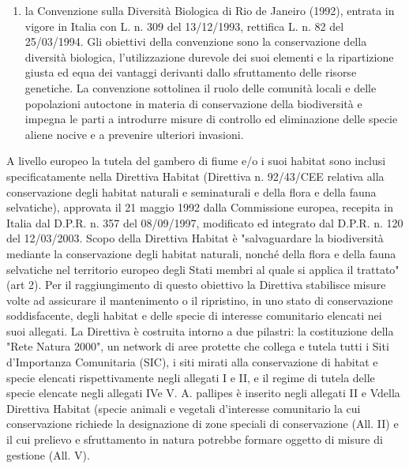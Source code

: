 \documentclass[11pt,a4paper,italian,twoside,openany]{memoir}
\begin{document}
\begin{enumerate}[label=\roman*]
  \item la Convenzione sulla Diversità Biologica di Rio de Janeiro (1992), entrata in vigore in Italia con L. n. 309 del 13/12/1993, rettifica L. n. 82 del 25/03/1994. Gli obiettivi della convenzione sono la conservazione della diversità biologica, l'utilizzazione durevole dei suoi elementi e la ripartizione giusta ed equa dei vantaggi derivanti dallo sfruttamento delle risorse genetiche. La convenzione sottolinea il ruolo delle comunità locali e delle popolazioni autoctone in materia di conservazione della biodiversità e impegna le parti a introdurre misure di controllo ed eliminazione delle specie aliene nocive e a prevenire ulteriori invasioni.
\end{enumerate}

A livello europeo la tutela del gambero di fiume e/o i suoi habitat sono inclusi specificatamente nella Direttiva Habitat (Direttiva n. 92/43/CEE relativa alla conservazione degli habitat naturali e seminaturali e della flora e della fauna selvatiche), approvata il 21 maggio 1992 dalla Commissione europea, recepita in Italia dal D.P.R. n. 357 del 08/09/1997, modificato ed integrato dal D.P.R. n. 120 del 12/03/2003. Scopo della Direttiva Habitat è "salvaguardare la biodiversità mediante la conservazione degli habitat naturali, nonché della flora e della fauna selvatiche nel territorio europeo degli Stati membri al quale si applica il trattato" (art 2). Per il raggiungimento di questo obiettivo la Direttiva stabilisce misure volte ad assicurare il mantenimento o il ripristino, in uno stato di conservazione soddisfacente, degli habitat e delle specie di interesse comunitario elencati nei suoi allegati. La Direttiva è costruita intorno a due pilastri: la costituzione della "Rete Natura 2000", un network di aree protette che collega e tutela tutti i Siti d'Importanza Comunitaria (SIC), i siti mirati alla conservazione di habitat e specie elencati rispettivamente negli allegati I e II, e il regime di tutela delle specie elencate negli allegati IVe V. A. pallipes  è inserito negli allegati II e Vdella Direttiva Habitat (specie animali e vegetali d'interesse comunitario la cui conservazione richiede la designazione di zone speciali di conservazione (All. II) e il cui prelievo e sfruttamento in natura potrebbe formare oggetto di misure di gestione (All. V). 
\end{document}

